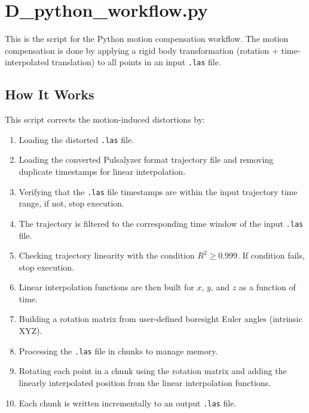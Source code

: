 \chapter{D\_python\_workflow.py}
\label{ch:pythonWorkflow}

This is the script for the Python motion compensation workflow. The motion compensation is done by applying a rigid body transformation (rotation + time-interpolated translation) to all points in an input \texttt{.las} file.

\section{How It Works}
This script corrects the motion-induced distortions by:
\begin{enumerate}
    \item Loading the distorted \texttt{.las} file.
    \item Loading the converted Pulsalyzer format trajectory file and removing duplicate timestamps for linear interpolation.
    \item Verifying that the \texttt{.las} file timestamps are within the input trajectory time range, if not, stop execution.
    \item The trajectory is filtered to the corresponding time window of the input \texttt{.las} file.
    \item Checking trajectory linearity with the condition $R^2 \ge 0.999$. If condition fails, stop execution.
    \item Linear interpolation functions are then built for $x$, $y$, and $z$ as a function of time.
    \item Building a rotation matrix from user-defined boresight Euler angles (intrinsic XYZ).
    \item Processing the \texttt{.las} file in chunks to manage memory.
    \item Rotating each point in a chunk using the rotation matrix and adding the linearly interpolated position from the linear interpolation functions.
    \item Each chunk is written incrementally to an output \texttt{.las} file.
\end{enumerate}

